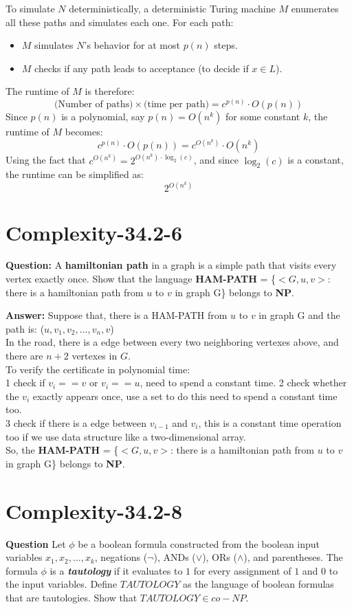 \documentclass[12pt]{article}
\begin{document}
To simulate \(N\) deterministically, a deterministic Turing machine \(M\) enumerates all these paths and simulates each one. For each path:
\begin{itemize}
    \item \(M\) simulates \(N\)'s behavior for at most \(p(n)\) steps.
    \item \(M\) checks if any path leads to acceptance (to decide if \(x \in L\)).
\end{itemize}
The runtime of \(M\) is therefore:
\[
\text{(Number of paths)} \times \text{(time per path)} = c^{p(n)} \cdot O(p(n))
\]
Since \(p(n)\) is a polynomial, say \(p(n) = O(n^k)\) for some constant \(k\), the runtime of \(M\) becomes:
\[
c^{p(n)} \cdot O(p(n)) = c^{O(n^k)} \cdot O(n^k)
\]
Using the fact that \(c^{O(n^k)} = 2^{O(n^k) \cdot \log_2(c)}\), and since \(\log_2(c)\) is a constant, the runtime can be simplified as:
\[
2^{O(n^k)}
\]





\section{Complexity-34.2-6}
\textbf{Question:}
A \textbf{hamiltonian path} in a graph is a simple path that visits every vertex exactly once. Show that the language \textbf{HAM-PATH} = \{$<G, u, v>$: there is a hamiltonian path from $u$ to $v$ in graph G\} belongs to \textbf{NP}.

\textbf{Answer:}
Suppose that, there is a HAM-PATH from $u$ to $v$ in graph G and the path is: ($u, v_1, v_2,...,v_n, v$)\\
In the road, there is a edge between every two neighboring vertexes above, and there are $n+2$ vertexes in $G$.\\
To verify the certificate in polynomial time:\\
1 check if $v_i == v$ or $v_i == u$, need to spend a constant time.
2 check whether the $v_i$ exactly appears once, use a set to do this need to spend a constant time too.\\
3 check if there is a edge between $v_{i-1}$ and $v_i$, this is a constant time operation too if we use data structure like a two-dimensional array.\\
So, the \textbf{HAM-PATH} = \{$<G, u, v>$: there is a hamiltonian path from $u$ to $v$ in graph G\} belongs to \textbf{NP}.

\section{Complexity-34.2-8}
\textbf{Question}
Let $\phi$ be a boolean formula constructed from the boolean input variables $x_1, x_2, \dots, x_k$, negations ($\neg$), ANDs ($\vee$), ORs ($\wedge$), and parentheses. The formula $\phi$ is a \textit{\textbf{tautology}} if it evaluates to $1$ for every assignment of $1$ and $0$ to the input variables. Define $TAUTOLOGY$ as the language of boolean formulas that are tautologies. Show that $TAUTOLOGY \in co-NP$.
\end{document}
